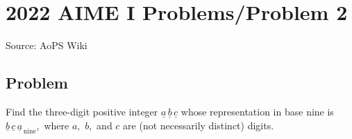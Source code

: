 \documentclass[12pt]{article}
\begin{document}
\section*{{2022 AIME I Problems/Problem 2}}
Source: AoPS Wiki

\subsection*{Problem}
Find the three-digit positive integer $\underline{a}\,\underline{b}\,\underline{c}$ whose representation in base nine is $\underline{b}\,\underline{c}\,\underline{a}_{\,\text{nine}},$ where $a,$ $b,$ and $c$ are (not necessarily distinct) digits.
\end{document}
